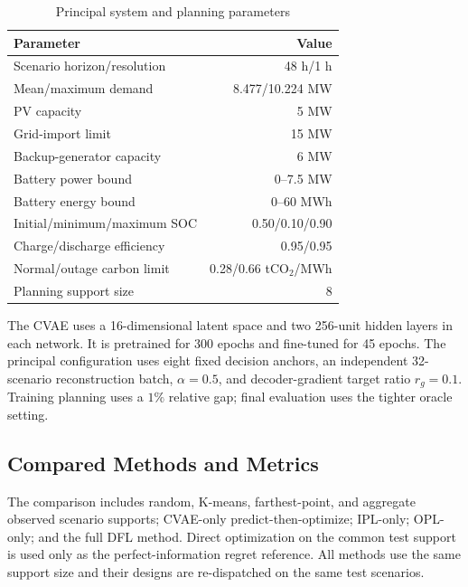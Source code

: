 \documentclass[times]{elsarticle}
\begin{document}
\begin{table}[t]
\centering
\caption{Principal system and planning parameters}
\label{tab:parameters}
\begin{tabular}{@{}lr@{}}
\toprule
Parameter & Value \\
\midrule
Scenario horizon/resolution & 48 h/1 h \\
Mean/maximum demand & 8.477/10.224 MW \\
PV capacity & 5 MW \\
Grid-import limit & 15 MW \\
Backup-generator capacity & 6 MW \\
Battery power bound & 0--7.5 MW \\
Battery energy bound & 0--60 MWh \\
Initial/minimum/maximum SOC & 0.50/0.10/0.90 \\
Charge/discharge efficiency & 0.95/0.95 \\
Normal/outage carbon limit & 0.28/0.66 tCO$_2$/MWh \\
Planning support size & 8 \\
\bottomrule
\end{tabular}
\end{table}

The CVAE uses a 16-dimensional latent space and two 256-unit hidden layers in
each network. It is pretrained for 300 epochs and fine-tuned for 45 epochs. The
principal configuration uses eight fixed decision anchors, an independent
32-scenario reconstruction batch, $\alpha=0.5$, and decoder-gradient target
ratio $r_g=0.1$. Training planning uses a $1\%$ relative gap; final evaluation
uses the tighter oracle setting.

\subsection{Compared Methods and Metrics}

The comparison includes random, K-means, farthest-point, and aggregate observed
scenario supports; CVAE-only predict-then-optimize; IPL-only; OPL-only; and the
full DFL method. Direct optimization on the common test support is used only as
the perfect-information regret reference. All methods use the same support size
and their designs are re-dispatched on the same test scenarios.
\end{document}

